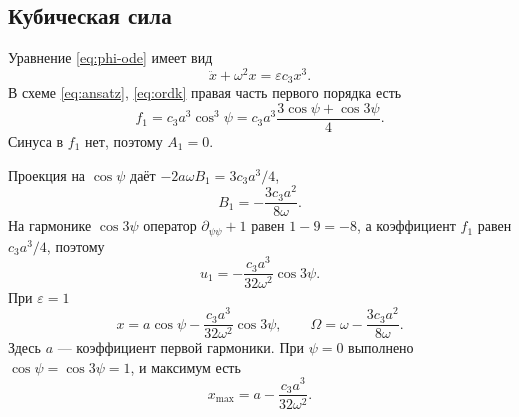 \subsection{Кубическая сила}
\label{sec:bm-cubic}

Уравнение \eqref{eq:phi-ode} имеет вид
\begin{equation}
\label{eq:bm-c}
\ddot x+\omega^2 x=\varepsilon c_3 x^3.
\end{equation}
В схеме \eqref{eq:ansatz}, \eqref{eq:ordk} правая часть первого порядка есть
\begin{equation}
\label{eq:f1c}
f_1=c_3 a^3\cos^3\psi
=c_3 a^3\frac{3\cos\psi+\cos 3\psi}{4}.
\end{equation}
Синуса в $f_1$ нет, поэтому $A_1=0$.

Проекция на $\cos\psi$ даёт $-2a\omega B_1=3c_3 a^3/4$,
\begin{equation}
\label{eq:B1c}
B_1=-\frac{3c_3 a^2}{8\omega}.
\end{equation}
На гармонике $\cos 3\psi$ оператор $\partial_{\psi\psi}+1$ равен $1-9=-8$, а коэффициент $f_1$ равен $c_3 a^3/4$, поэтому
\begin{equation}
\label{eq:u1c}
u_1=-\frac{c_3 a^3}{32\omega^2}\cos 3\psi.
\end{equation}
При $\varepsilon=1$
\begin{equation}
\label{eq:xc}
x=a\cos\psi-\frac{c_3 a^3}{32\omega^2}\cos 3\psi,
\qquad
\Omega=\omega-\frac{3c_3 a^2}{8\omega}.
\end{equation}
Здесь $a$ --- коэффициент первой гармоники. При $\psi=0$ выполнено $\cos\psi=\cos 3\psi=1$, и максимум есть
\begin{equation}
\label{eq:xmax}
x_{\max}=a-\frac{c_3 a^3}{32\omega^2}.
\end{equation}


